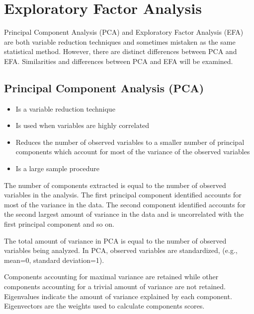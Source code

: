 \documentclass[a4paper,12pt]{article}
\begin{document}
	
	\tableofcontents

\section{Exploratory Factor Analysis}
Principal Component Analysis (PCA) and Exploratory Factor Analysis (EFA) are both variable reduction techniques
and sometimes mistaken as the same statistical method. However, there are distinct differences between PCA and
EFA. Similarities and differences between PCA and EFA will be examined.


\subsection{Principal Component Analysis (PCA)}
\begin{itemize}
\item Is a variable reduction technique
\item Is used when variables are highly correlated
\item Reduces the number of observed variables to a smaller number of principal components which account for most
of the variance of the observed variables
\item Is a large sample procedure
\end{itemize}

The number of components extracted is equal to the number of observed variables in the analysis. The first principal
component identified accounts for most of the variance in the data. The second component identified accounts for the
second largest amount of variance in the data and is uncorrelated with the first principal component and so on.


The total amount of variance in PCA is equal to the number of observed variables being analyzed. In PCA, observed
variables are standardized, (e.g., mean=0, standard deviation=1).

Components accounting for maximal variance are retained while other components accounting for a trivial amount of
variance are not retained. Eigenvalues indicate the amount of variance explained by each component. Eigenvectors
are the weights used to calculate components scores.
\end{document}
